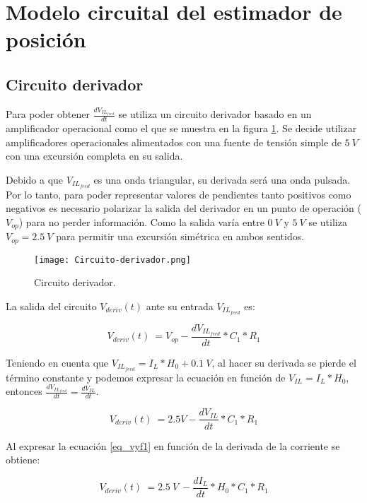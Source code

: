 \section{Modelo circuital del estimador de posición}

\subsection{Circuito derivador}

Para poder obtener $\frac{dV_{IL_{feed}}}{dt}$ se utiliza un circuito derivador basado en un amplificador operacional como el que se muestra en la figura \ref{fig:img_Circuito-derivador}. Se decide utilizar amplificadores operacionales alimentados con una fuente de tensión simple de $5\:V$ con una excursión completa en su salida. 

Debido a que $V_{IL_{feed}}$ es una onda triangular, su derivada será una onda pulsada. Por lo tanto, para poder representar valores de pendientes tanto positivos como negativos es necesario polarizar la salida del derivador en un punto de operación ($V_{op}$) para no perder información. Como la salida varía entre $0\:V$ y $5\:V$ se utiliza $V_{op}=2.5\:V$ para permitir una excursión simétrica en ambos sentidos.

\begin{figure}[H]
	\centering
	\texttt{[image: Circuito-derivador.png]}
	\caption{Circuito derivador.}
	\label{fig:img_Circuito-derivador}
\end{figure}


La salida del circuito $V_{deriv}(t)$ ante su entrada $V_{IL_{feed}}$ es:

\begin{equation} 
	V_{deriv}(t)\ = V_{op} - \frac{dV_{IL_{feed}}}{dt}*C_1*R_1
\end{equation}

Teniendo en cuenta que $V_{IL_{feed}}=I_L*H_0+0.1\:V$, al hacer su derivada se pierde el término constante y podemos expresar la ecuación en función de $V_{IL}=I_L*H_0$, entonces $ \frac{dV_{IL_{feed}}}{dt}= \frac{dV_{IL}}{dt}$.

\begin{equation} \label{eq_vyf1}
	V_{deriv}(t)\ = 2.5V - \frac{dV_{IL}}{dt}*C_1*R_1
\end{equation}

Al expresar la ecuación \ref{eq_vyf1} en función de la derivada de la corriente se obtiene:

\begin{equation} \label{eq_vyf2}
	V_{deriv}(t)\ =2.5\:V\ -\frac{dI_L}{dt}*H_0*C_1*R_1
\end{equation}

